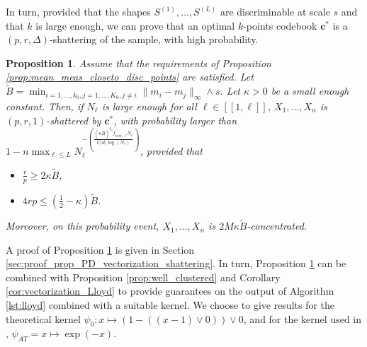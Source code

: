 \documentclass[noinfoline,preprint]{article}
\newtheorem{prop}[theorem]{Proposition}
\newcommand{\cb}{\mathbf{c}}
\renewcommand{\1}{\mathds 1}
\begin{document}
In turn, provided that the shapes $S^{(1)}, \hdots, S^{(L)}$ are discriminable at scale $s$ and that $k$ is large enough, we can prove that an optimal $k$-points codebook $\cb^*$ is a $(p,r,\Delta)$-shattering of the sample, with high probability.
\begin{prop}\label{prop:PD_vectorization_shattering}
Assume that the requirements of Proposition \ref{prop:mean_meas_closeto_disc_points} are satisfied. Let $\tilde{B}= \min_{i=1, \hdots, k_0, j =1, \hdots, K_0, j \neq i} \| m_i - m_j \|_\infty \wedge s$. Let $\kappa >0$ be a small enough constant. Then, if $N_\ell$ is large enough for all $\ell \in [\![1,\ell]\!]$, $X_1, \hdots, X_n$ is $(p,r,1)$-shattered by $\cb^*$, with probability larger than $1- n \max_{\ell \leq L}N_\ell^{-\left ( \frac{(\kappa \tilde{B})^{d_\ell} f_{min,\ell} N_\ell}{C_\ell d_\ell \log(N_\ell)}\right)}$, provided that
\begin{itemize}
\item $\frac{r}{p} \geq 2 \kappa \tilde{B}$,
\item $4rp \leq \left( \frac{1}{2} - \kappa \right ) \tilde{B}$.
\end{itemize}
Moreover, on this probability event, $X_1, \hdots, X_n$ is $2 M \kappa \tilde{B}$-concentrated.  
\end{prop}
A proof of Proposition \ref{prop:PD_vectorization_shattering} is given in Section \ref{sec:proof_prop_PD_vectorization_shattering}. In turn, Proposition \ref{prop:PD_vectorization_shattering} can be combined with Proposition \ref{prop:well_clustered} and Corollary \ref{cor:vectorization_Lloyd} to provide guarantees on the output of Algorithm \ref{lst:lloyd} combined with a suitable kernel. We choose to give results for the theoretical kernel $\psi_0:x \mapsto (1- ((x-1) \vee 0)) \vee 0$, and for the kernel used in \cite{Royer19}, $\psi_{AT} = x \mapsto \exp(-x)$.
\end{document}

